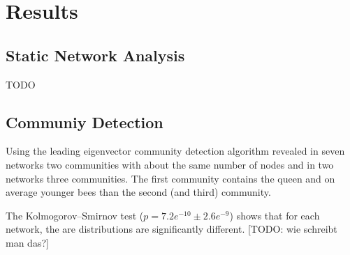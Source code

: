 \chapter{Results}



\section{Static Network Analysis}
TODO

\section{Communiy Detection}

Using the leading eigenvector community detection algorithm revealed in seven networks two communities with about the same number of nodes and in two networks three communities. The first community contains the queen and on average younger bees than the second (and third) community.

The Kolmogorov–Smirnov  test ($p=7.2e^{-10} \pm2.6e^{-9}$) shows that for each network, the are distributions are significantly different. [TODO: wie schreibt man das?]

